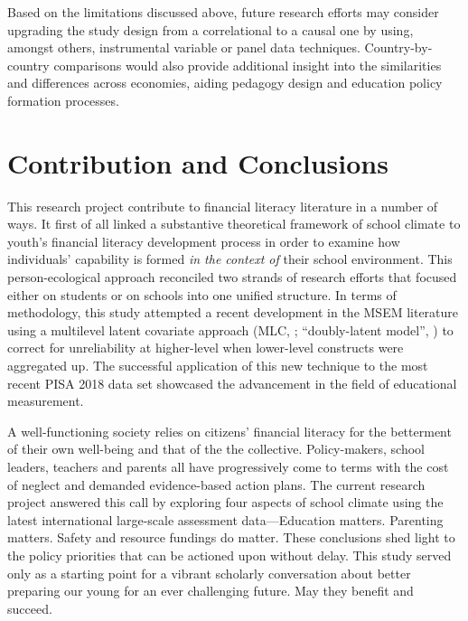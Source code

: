 \documentclass[a4paper,11pt,UKenglish,twoside,openright]{report}\usepackage[]{graphicx}\usepackage[]{color}
\begin{document}
Based on the limitations discussed above, future research efforts may consider upgrading the study design from a correlational to a causal one by using, amongst others, instrumental variable \parencite{pokropek:2016} or panel data \parencite{salasvelasco:2019} techniques. Country-by-country comparisons would also provide additional insight into the similarities and differences across economies, aiding pedagogy design and education policy formation processes.

\section{Contribution and Conclusions}

This research project contribute to financial literacy literature in a number of ways. It first of all linked a substantive theoretical framework of school climate to youth's financial literacy development process in order to examine how individuals' capability is formed \emph{in the context of} their school environment. This person-ecological approach reconciled two strands of research efforts that focused either on students or on schools into one unified structure. In terms of methodology, this study attempted a recent development in the MSEM literature using a multilevel latent covariate approach (MLC, \textcite{ludtke:2008}; ``doubly-latent model'', \textcite{marsh:2009}) to correct for unreliability at higher-level when lower-level constructs were aggregated up. The successful application of this new technique to the most recent PISA 2018 data set showcased the advancement in the field of educational measurement.


A well-functioning society relies on citizens' financial literacy for the betterment of their own well-being and that of the the collective. Policy-makers, school leaders, teachers and parents all have progressively come to terms with the cost of neglect and demanded evidence-based action plans. The current research project answered this call by exploring four aspects of school climate using the latest international large-scale assessment data---Education matters. Parenting matters. Safety and resource fundings do matter. These conclusions shed light to the policy priorities that can be actioned upon without delay. This study served only as a starting point for a vibrant scholarly conversation about better preparing our young for an ever challenging future. May they benefit and succeed.
\end{document}
